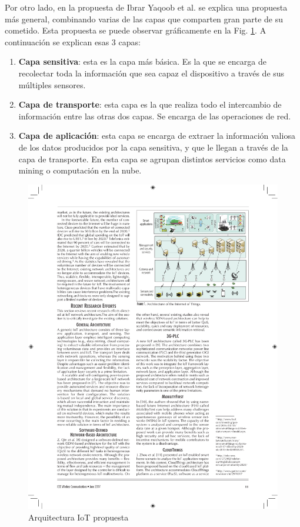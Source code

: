 Por otro lado, en la propuesta de Ibrar Yaqoob et al. \cite{yaqoob2017internet} se explica una propuesta más general, combinando varias de las capas que comparten gran parte de su cometido. Esta propuesta se puede observar gráficamente en la Fig. \ref{fig:iot_architecture}. A continuación se explican esas 3 capas:

\begin{enumerate}
    \item \textbf{Capa sensitiva}: esta es la capa más básica. Es la que se encarga de recolectar toda la información que sea capaz el dispositivo a través de sus múltiples sensores.
    \item \textbf{Capa de transporte}: esta capa es la que realiza todo el intercambio de información entre las otras dos capas. Se encarga de las operaciones de red.
    \item \textbf{Capa de aplicación}: esta capa se encarga de extraer la información valiosa de los datos producidos por la capa sensitiva, y que le llegan a través de la capa de transporte. En esta capa se agrupan distintos servicios como data mining o computación en la nube.
\end{enumerate}

\begin{figure}[htpb!]
    \centering
    \includegraphics{images/iot_architecture.pdf}
    \caption{Arquitectura IoT propuesta \cite{yaqoob2017internet}}
    \label{fig:iot_architecture}
\end{figure}

